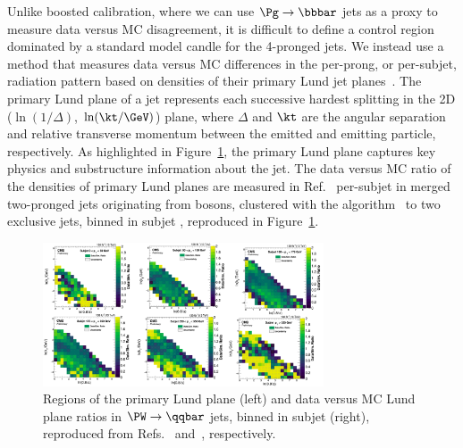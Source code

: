 Unlike boosted \hbb calibration, where we can use $\Pg\to\bbbar$ jets as a proxy to measure data versus MC disagreement, it is difficult to define a control region dominated by a standard model candle for the 4-pronged \hvvq jets.
We instead use a method that measures data versus MC differences in the per-prong, or per-subjet, radiation pattern based on densities of their primary Lund jet planes~\cite{Dreyer:2018nbf}.
The primary Lund plane of a jet represents each successive hardest splitting in the 2D ($\ln(1/\Delta)$, $\ln(\kt/\GeV)$) plane, where $\Delta$ and $\kt$ are the angular separation and relative transverse momentum between the emitted and emitting particle, respectively.
As highlighted in Figure~\ref{fig:05_part_lundplane}, the primary Lund plane captures key physics and substructure information about the jet.
The data versus MC ratio of the densities of primary Lund planes are measured in Ref.~\cite{CMS-DP-2023-046} per-subjet in merged two-pronged jets originating from \PW bosons, clustered with the \kt algorithm~\cite{Catani:1993hr, Ellis:1993tq} to two exclusive jets, binned in subjet \pt, reproduced in Figure~\ref{fig:05_part_lundplane}.

\begin{figure}[htb!]
\centering
{}
\includegraphics[width=0.74\textwidth]{figures/05-HH/part/lundratios.png}
\caption{Regions of the primary Lund plane (left) and data versus MC Lund plane ratios in $\PW\to\qqbar$ jets, binned in subjet \pt (right), reproduced from Refs.~\cite{Dreyer:2018nbf} and~\cite{CMS-DP-2023-046}, respectively.}
\label{fig:05_part_lundplane}
\end{figure}

